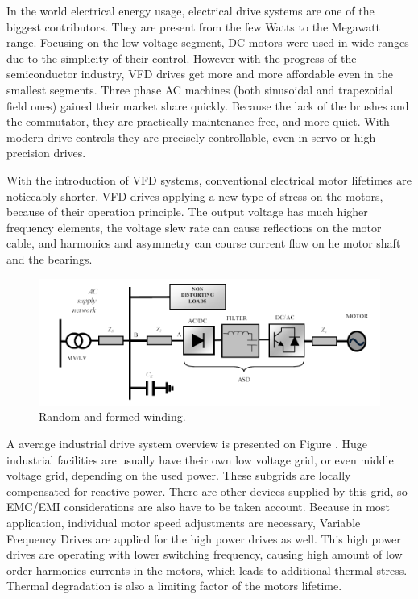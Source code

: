 In the world electrical energy usage, electrical drive systems are one of the biggest contributors. They are present from the few Watts to the Megawatt range. Focusing on the low voltage segment, DC motors were used in wide ranges due to the simplicity of their control. However with the progress of the semiconductor industry, VFD drives get more and more affordable even in the smallest segments. Three phase AC machines (both sinusoidal and trapezoidal field ones) gained their market share quickly. Because the lack of the brushes and the commutator, they are practically maintenance free, and more quiet. With modern drive controls they are precisely controllable, even in servo or high precision drives.

With the introduction of VFD systems, conventional electrical motor lifetimes are noticeably shorter. VFD drives applying a new type of stress on the motors, because of their operation principle. The output voltage has much higher frequency elements, the voltage slew rate can cause reflections on the motor cable, and harmonics and asymmetry can course current flow on he motor shaft and the bearings. 

\begin{figure}[h]
 \centerline{\includegraphics[width=.85\columnwidth]{.//figures/ac_plant.png}}
 \caption{Random and formed winding.}
 \label{fig:acplant}
\end{figure}

A average industrial drive system overview is presented on Figure . Huge industrial facilities are usually have their own low voltage grid, or even middle voltage grid, depending on the used power. These subgrids are locally compensated for reactive power. There are other devices supplied by this grid, so EMC/EMI considerations are also have to be taken account. Because in most application, individual motor speed adjustments are necessary, Variable Frequency Drives are applied for the high power drives as well. This high power drives are operating with lower switching frequency, causing high amount of low order harmonics currents in the motors, which leads to additional thermal stress. Thermal degradation is also a limiting factor of the motors lifetime.


